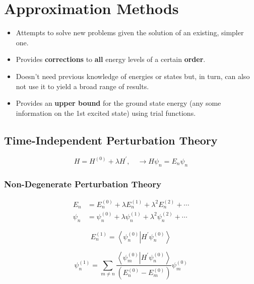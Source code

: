 \section{Approximation Methods}

\begin{itemize}
    \item Attempts to solve new problems given the solution of an existing, simpler one.
    \item Provides \textbf{corrections} to \textbf{all} energy levels of a certain \textbf{order}.
\end{itemize}
\begin{itemize}
    \item Doesn't need previous knowledge of energies or states but, in turn, can also not use it to yield a broad range of results.
    \item Provides an \textbf{upper bound} for the ground state energy (any some information on the 1st excited state) using trial functions.
\end{itemize}

\subsection{Time-Independent Perturbation Theory}
\noindent\begin{equation*}
    H=H^{(0)}+\lambda H^{\prime}, \quad \to H\psi_n = E_n \psi_n
\end{equation*}

\subsubsection{Non-Degenerate Perturbation Theory}
\noindent\begin{align*}
    E_{n}    & =E_{n}^{(0)}+\lambda E_{n}^{(1)}+\lambda^{2}E_{n}^{(2)}+\cdots         \\
    \psi_{n} & =\psi_{n}^{(0)}+\lambda\psi_{n}^{(1)}+\lambda^{2}\psi_{n}^{(2)}+\cdots
\end{align*}

\begin{equation*}
    E_{n}^{(1)}=\left\langle\psi_{n}^{(0)}\right| H^{\prime} \left.\psi_{n}^{(0)}\right\rangle
\end{equation*}

\begin{equation*}
    \psi_{n}^{(1)}=\sum_{m\neq n}\frac{\left\langle\psi_{m}^{(0)}\right|H^{\prime}\left.\psi_{n}^{(0)}\right\rangle}{\left(E_{n}^{(0)}-E_{m}^{(0)}\right)}\psi_{m}^{(0)}
\end{equation*}

